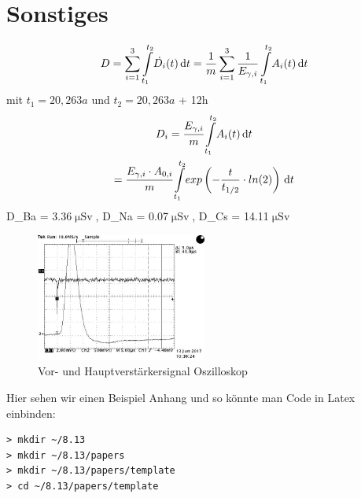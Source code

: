 \documentclass[aps,twocolumn,secnumarabic,nobalancelastpage,amsmath,amssymb,
nofootinbib,superscriptaddress]{revtex4-1}
\begin{document}
\clearpage
\appendix

\section{Sonstiges}

\begin{equation}
  D = \sum\limits_{i=1}^3 \int\limits_{t_1}^{t_2} \! \dot{D_i}(t) \, \mathrm{d}t = \frac{1}{m}\sum\limits_{i=1}^3
  \frac{1}{E_{\gamma,i}} \int\limits_{t_1}^{t_2} \! A_{i}(t) \, \mathrm{d}t  \newline
\end{equation}
mit $t_1 = 20,263a$ und $t_2 = 20,263a$ + 12h
\begin{equation}
  \begin{gathered}
    D_i = \cfrac{E_{\gamma,i}}{m} \int\limits_{t_1}^{t_2} \! A_i(t) \, \mathrm{d}t \\
    = \cfrac{E_{\gamma,i}\cdot A_{0,i}}{m} \int\limits_{t_1}^{t_2} \! exp\left(-\frac{t}{t_{1/2}}\cdot ln(2)\right) \, \mathrm{d}t
  \end{gathered}
\end{equation}
\Rightarrow D_{Ba} = 3.36\:$\upmu\text{Sv}$,\: D_{Na} = 0.07\:$\upmu\text{Sv}$,\: D_{Cs} = 14.11\:$\upmu\text{Sv}$
\vspace{3em}

\begin{figure}[h]
  \centering
  \includegraphics[width=0.5\textwidth]{../Messung/OsziVerstaerkerkurve/TEK00009.jpg}
  \caption{\label{fig:aufbau} Vor- und Hauptverstärkersignal Oszilloskop}
\end{figure}

Hier sehen wir einen Beispiel Anhang und so könnte man Code in Latex einbinden:
\begin{verbatim}
> mkdir ~/8.13
> mkdir ~/8.13/papers
> mkdir ~/8.13/papers/template
> cd ~/8.13/papers/template
\end{verbatim}


\end{document}
